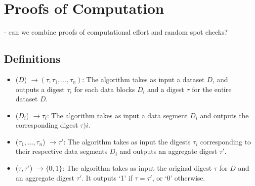 \section{Proofs of Computation} \label{sect:poc}

- can we combine proofs of computational effort and random spot checks?


\subsection{Definitions} \label{sect:poc-definition}

\begin{itemize}
\item \Setup($D$) $\rightarrow (\tau,\tau_1,\dotsc,\tau_n)$: The algorithm takes as input a dataset $D$, and outputs a digest $\tau_i$ for each data blocks $D_i$ and a digest $\tau$ for the entire dataset $D$.

\item \Prove($D_i$) $\rightarrow \tau_i$: The algorithm takes as input a data segment $D_i$ and outputs the corresponding digest $\tau)i$.

\item \Aggregate($\tau_1,\dotsc,\tau_n$) $\rightarrow \tau'$: The algorithm takes as input the digests $\tau_i$ corresponding to their respective data segments $D_i$ and outputs an aggregate digest $\tau'$.

\item \Verify($\tau, \tau'$) $\rightarrow \{0,1\}$: The algorithm takes as input the original digest $\tau$ for $D$ and an aggregate digest $\tau'$. It outputs `1' if $\tau=\tau'$, or `0' otherwise.
\end{itemize}
